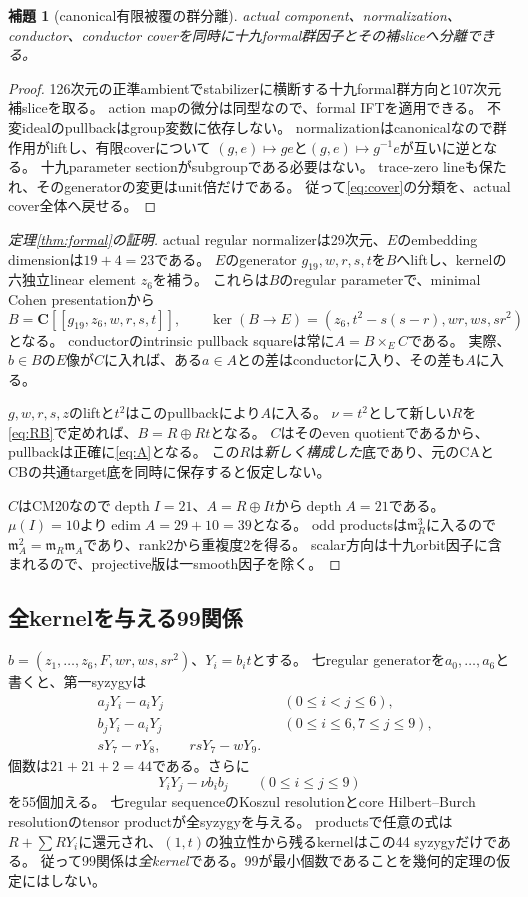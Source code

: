 \documentclass[11pt,a4paper]{ltjsarticle}
\newcommand{\CC}{\mathbf C}
\newcommand{\edim}{\operatorname{edim}}
\newcommand{\depth}{\operatorname{depth}}
\newtheorem{lemma}[theorem]{補題}
\theoremstyle{definition}
\theoremstyle{remark}
\begin{document}
\begin{lemma}[canonical有限被覆の群分離]\label{lem:group}
actual component、normalization、conductor、conductor coverを同時に十九formal群因子とその補sliceへ分離できる。
\end{lemma}
\begin{proof}
126次元の正準ambientでstabilizerに横断する十九formal群方向と107次元補sliceを取る。
action mapの微分は同型なので、formal IFTを適用できる。
不変idealのpullbackはgroup変数に依存しない。
normalizationはcanonicalなので群作用がliftし、有限coverについて
$(g,e)\mapsto g e$と$(g,e)\mapsto g^{-1}e$が互いに逆となる。
十九parameter sectionがsubgroupである必要はない。
trace-zero lineも保たれ、そのgeneratorの変更はunit倍だけである。
従って\eqref{eq:cover}の分類を、actual cover全体へ戻せる。
\end{proof}

\begin{proof}[定理\ref{thm:formal}の証明]
actual regular normalizerは29次元、$E$のembedding dimensionは$19+4=23$である。
$E$のgenerator $g_{19},w,r,s,t$を$B$へliftし、kernelの六独立linear element $z_6$を補う。
これらは$B$のregular parameterで、minimal Cohen presentationから
\[
 B=\CC[[g_{19},z_6,w,r,s,t]],\qquad
 \ker(B\to E)=(z_6,t^2-s(s-r),wr,ws,sr^2)
\]
となる。
conductorのintrinsic pullback squareは常に$A=B\times_E C$である。
実際、$b\in B$の$E$像が$C$に入れば、ある$a\in A$との差はconductorに入り、その差も$A$に入る。

$g,w,r,s,z$のliftと$t^2$はこのpullbackにより$A$に入る。
$\nu=t^2$として新しい$R$を\eqref{eq:RB}で定めれば、$B=R\oplus Rt$となる。
$C$はそのeven quotientであるから、pullbackは正確に\eqref{eq:A}となる。
この$R$は\emph{新しく構成した}底であり、元のCAとCBの共通target底を同時に保存すると仮定しない。

$C$はCM20なので$\depth I=21$、$A=R\oplus It$から$\depth A=21$である。
$\mu(I)=10$より$\edim A=29+10=39$となる。
odd productsは$\mathfrak m_R^3$に入るので$\mathfrak m_A^2=\mathfrak m_R\mathfrak m_A$であり、rank2から重複度2を得る。
scalar方向は十九orbit因子に含まれるので、projective版は一smooth因子を除く。
\end{proof}

\subsection{全kernelを与える99関係}

$b=(z_1,\ldots,z_6,F,wr,ws,sr^2)$、$Y_i=b_it$とする。
七regular generatorを$a_0,\ldots,a_6$と書くと、第一syzygyは
\begin{align*}
 &a_jY_i-a_iY_j &&(0\le i<j\le6),\\
 &b_jY_i-a_iY_j &&(0\le i\le6, 7\le j\le9),\\
 &sY_7-rY_8,\qquad rsY_7-wY_9.&
\end{align*}
個数は$21+21+2=44$である。さらに
\[
 Y_iY_j-\nu b_ib_j\qquad(0\le i\le j\le9)
\]
を55個加える。
七regular sequenceのKoszul resolutionとcore Hilbert--Burch resolutionのtensor productが全syzygyを与える。
productsで任意の式は$R+\sum RY_i$に還元され、$(1,t)$の独立性から残るkernelはこの44 syzygyだけである。
従って99関係は\emph{全kernel}である。99が最小個数であることを幾何的定理の仮定にはしない。
\end{document}
